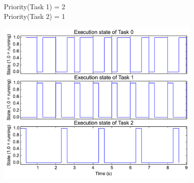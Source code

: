 \documentclass{article}
\begin{document}
Priority(Task 1) = 2 \\
Priority(Task 2) = 1
\begin{center}
\includegraphics[width=4in]{ctx-switch-trace-flipped}
\end{center}
\end{document}
